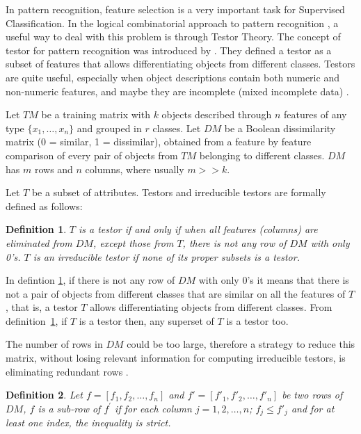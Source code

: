 \documentclass[conference]{IEEEtran}
\newtheorem{definition}{Definition}
\begin{document}
In pattern recognition, feature selection is a very important task for Supervised Classification. In the logical
 combinatorial approach to pattern recognition \cite{Martinez01}, a useful
way to deal with this problem is through Testor Theory. The concept of testor for pattern recognition was
introduced by \cite{Dmitriev66}. They defined a testor as a subset of features that allows
differentiating objects from different classes. Testors are quite useful, especially when object descriptions
contain both numeric and non-numeric features, and maybe they are incomplete (mixed incomplete data)
\cite{Martinez01}. 

Let $TM$ be a training matrix with $k$ objects described through $n$
features of any type $\{x_{1},\ldots,x_{n}\}$ and grouped in $r$
classes. Let $DM$ be a Boolean dissimilarity matrix (0 = similar, 1 =
dissimilar), obtained from a feature by feature comparison of every
pair of objects from $TM$ belonging to different classes. $DM$ has
$m$ rows and $n$ columns, where usually $m>>k$.

Let $T$ be a subset of attributes. Testors and irreducible testors are formally defined as follows:

\begin{definition} \label{def1}
$T$ is a testor if and only if when all
features (columns) are eliminated from $DM$, except those from $T$, there is
not any row of $DM$ with only 0's. $T$ is an irreducible testor if none of its proper subsets is a testor.
\end{definition}

In defintion \ref{def1}, if there is not any row of $DM$ with only
0's it means that there is not a pair of objects from different
classes that are similar on all the features of $T$, that is, a
testor $T$ allows differentiating objects from different
classes. From definition~\ref{def1}, if $T$ is a testor then, any superset of $T$ is a testor too.

The number of rows in $DM$ could be too large, therefore a strategy to reduce this matrix, without losing
relevant information for computing irreducible testors, is eliminating redundant rows \cite{Lazo01}.

\begin{definition}
Let $f=[f_1, f_2, \dots , f_n]$ and $f'=[f'_1, {f'}_2, \dots , {f'}_n]$ be two rows of $DM$, $f$ 
is a sub-row of $f^{'}$ if for each column $j=1,2,\dots ,n$;  $f_{j} \le f'_{j}$ and for at least one index, the 
inequality is strict.
\end{definition}
\end{document}
